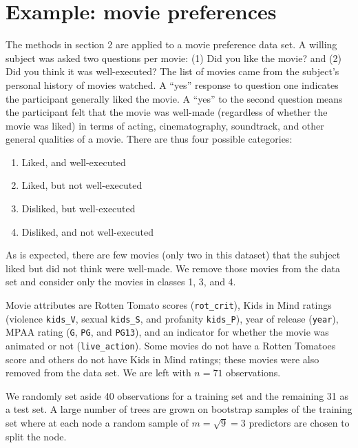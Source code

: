 \section{Example: movie preferences}

The methods in section 2 are applied to a movie preference data set. A willing subject was asked two questions per movie: (1) Did you like the movie? and (2) Did you think it was well-executed? The list of movies came from the subject's personal history of movies watched. A ``yes'' response to question one indicates the participant generally liked the movie. A ``yes'' to the second question means the participant felt that the movie was well-made (regardless of whether the movie was liked) in terms of acting, cinematography, soundtrack, and other general qualities of a movie. There are thus four possible categories:
\begin{enumerate}
\item Liked, and well-executed
\item Liked, but not well-executed
\item Disliked, but well-executed
\item Disliked, and not well-executed
\end{enumerate}
As is expected, there are few movies (only two in this dataset) that the subject liked but did not think were well-made. We remove those movies from the data set and consider only the movies in classes 1, 3, and 4.

Movie attributes are Rotten Tomato scores (\texttt{rot\_crit}), Kids in Mind ratings (violence \texttt{kids\_V}, sexual \texttt{kids\_S}, and profanity \texttt{kids\_P}), year of release (\texttt{year}), MPAA rating (\texttt{G}, \texttt{PG}, and \texttt{PG13}), and an indicator for whether the movie was animated or not (\texttt{live\_action}). Some movies do not have a Rotten Tomatoes score and others do not have Kids in Mind ratings; these movies were also removed from the data set. We are left with $n=71$ observations.

We randomly set aside 40 observations for a training set and the remaining 31 as a test set. A large number of trees are grown on bootstrap samples of the training set where at each node a random sample of $m=\sqrt{9}=3$ predictors are chosen to split the node.
